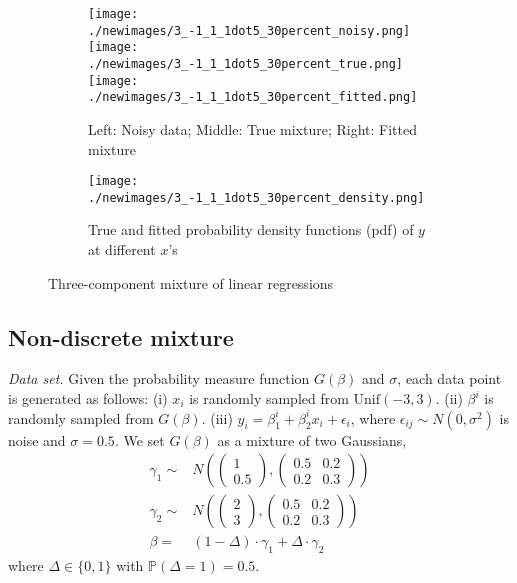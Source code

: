 \documentclass[11pt]{article}
\numberwithin{equation}{section}
\newcommand{\PP}{\mathbb{P}}
\begin{document}
\begin{figure}[!htbp]
\begin{subfigure}[b]{\textwidth}
\texttt{[image: ./newimages/3\_-1\_1\_1dot5\_30percent\_noisy.png]}
\texttt{[image: ./newimages/3\_-1\_1\_1dot5\_30percent\_true.png]}
\texttt{[image: ./newimages/3\_-1\_1\_1dot5\_30percent\_fitted.png]}
\caption{Left: Noisy data; Middle: True mixture; Right: Fitted mixture}
\end{subfigure}
\begin{subfigure}[b]{\textwidth}
\texttt{[image: ./newimages/3\_-1\_1\_1dot5\_30percent\_density.png]}
\caption{True and fitted probability density functions (pdf) of $y$ at different $x$'s }
\end{subfigure}
\caption{Three-component mixture of linear regressions}
\label{fig:3comp}
\end{figure}


\subsection{Non-discrete mixture} 
\label{section:continuous}

\emph{Data set.} Given the probability measure function $G(\beta)$ and $\sigma$, each data point is generated as follows: (i) $x_i$ is randomly sampled from $\mathrm{Unif}(-3,3)$. (ii) $\beta^i$ is randomly sampled from $G(\beta)$. (iii) $y_i = \beta^i_1 +\beta^i_2 x_i +\epsilon_i$, where $\epsilon_{ij} \sim N(0,\sigma^2)$ is noise and $\sigma = 0.5$. We set $G(\beta)$ as a mixture of two Gaussians, 
\[
\begin{split}
\gamma_1 \sim & N\left( \begin{pmatrix} 1\\ 0.5\end{pmatrix}, \begin{pmatrix} 0.5 & 0.2\\ 0.2& 0.3\end{pmatrix} \right)\\
\gamma_2 \sim & N\left( \begin{pmatrix} 2\\ 3\end{pmatrix}, \begin{pmatrix} 0.5 & 0.2\\ 0.2& 0.3\end{pmatrix} \right)\\
\beta = &(1-\Delta)\cdot \gamma_1 + \Delta\cdot \gamma_2
\end{split}
\]
where $\Delta \in \{ 0, 1\}$ with $\PP(\Delta = 1) = 0.5$. 
\end{document}
